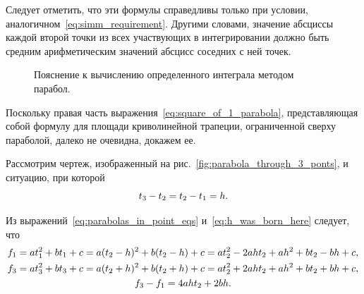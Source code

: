 \documentclass[12pt,a4paper,openany]{extarticle}
\begin{document}
Следует отметить, что эти формулы справедливы только при условии, аналогичном~\eqref{eq:simm_requirement}.
Другими словами, значение абсциссы каждой второй точки из всех участвующих в интегрировании должно быть средним арифметическим значений абсцисс соседних с ней точек.

\begin{figure}[h!]
	\caption{Пояснение к вычислению определенного интеграла методом парабол.}
	\label{fig:parabolas_method}
\end{figure}

Поскольку правая часть выражения~\eqref{eq:square_of_1_parabola}, представляющая собой формулу для площади криволинейной трапеции, ограниченной сверху параболой, далеко не очевидна, докажем ее.

Рассмотрим чертеж, изображенный на рис.~\ref{fig:parabola_through_3_ponts}, и ситуацию, при которой 
\begin{equation}\label{eq:h_was_born_here}
t_3-t_2 = t_2-t_1 = h\ldotp
\end{equation}

Из выражений~\eqref{eq:parabolas_in_point_eqs} и~\eqref{eq:h_was_born_here} следует, что
\begin{gather}
f_1 = a t_1^2 + b t_1 + c = a (t_2 - h)^2 + b(t_2 -h) + c = a t_2^2 - 2a h t_2 + a h^2 + b t_2 - b h + c,\label{eq:f1_super_eqs}\\
%
f_3 = a t_3^2 + b t_3 + c = a (t_2 + h)^2 + b(t_2 + h) + c = a t_2^2 + 2a h t_2 + a h^2 + b t_2 + b h + c,\\
%
f_3 - f_1 = 4 a h t_2 + 2 b h\ldotp \label{eq:f3mf1_super_eqs}
\end{gather}
\end{document}
